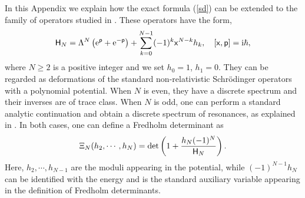 \documentclass[a4paper,11pt]{article}
\theoremstyle{definition}
\newcommand{\re}{{\rm e}}
\newcommand{\ri}{{\rm i}}
\newcommand{\mx}{\mathsf{x}}
\newcommand{\mm}{\mathsf{p}}
\newcommand{\mH}{\mathsf{H}}
\newcommand{\be}{\begin{equation}}
\newcommand{\ee}{\end{equation}}
\begin{document}
In this Appendix we explain how the exact formula (\ref{sd}) can be
extended to the family of operators studied in \cite{gm3}. These operators have the form, 
%
\be
\label{q-ham}
\mH_N=\Lambda^N\left(  \re^\mm+\re^{-\mm} \right) + \sum_{k=0}^{N-1} (-1)^k \mx^{N-k} h_k, \quad [\mx,\mm]=\ri \hbar,
\ee
%
where $N\ge 2$ is a positive integer and we set $h_0=1$, $h_1=0$. They can be regarded as deformations of the standard non-relativistic Schr\"odinger operators with a 
polynomial potential. When $N$ is even, they have a discrete spectrum and their inverses are of trace class. When $N$ is odd, one can 
perform a standard analytic continuation and obtain a discrete spectrum of resonances, as explained in \cite{gm3}. In both cases, one can define 
a Fredholm determinant as  
%
\be
 \Xi_N(h_2, \cdots, h_N)= \det\left(1+{h_N (-1)^N \over \mH_N} \right). 
 \ee
 Here, $h_2, \cdots, h_{N-1}$ are the moduli appearing in the potential, while $(-1)^{N-1} h_N$ can be identified with the energy and is the standard auxiliary variable appearing in 
 the definition of Fredholm determinants. 
 
\end{document}

